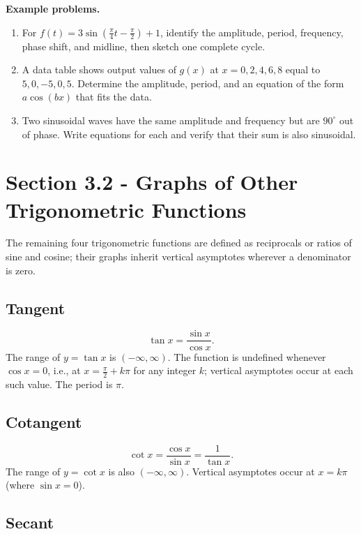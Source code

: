 \textbf{Example problems.}
\begin{enumerate}
    \item For $f(t) = 3\sin\!\left(\frac{\pi}{4}t - \frac{\pi}{2}\right) + 1$, identify the amplitude, period, frequency, phase shift, and midline, then sketch one complete cycle.
    \item A data table shows output values of $g(x)$ at $x = 0, 2, 4, 6, 8$ equal to $5, 0, -5, 0, 5$. Determine the amplitude, period, and an equation of the form $a\cos(bx)$ that fits the data.
    \item Two sinusoidal waves have the same amplitude and frequency but are $90^{\circ}$ out of phase. Write equations for each and verify that their sum is also sinusoidal.
\end{enumerate}

\section{Section 3.2 - Graphs of Other Trigonometric Functions}
\label{sec:sect-07b3}

The remaining four trigonometric functions are defined as reciprocals or
ratios of sine and cosine; their graphs inherit vertical asymptotes wherever
a denominator is zero.

\subsection*{Tangent}

\[
  \tan x = \frac{\sin x}{\cos x}.
\]
The range of $y = \tan x$ is $(-\infty, \infty)$.  The function is undefined
whenever $\cos x = 0$, i.e., at $x = \frac{\pi}{2} + k\pi$ for any integer
$k$; vertical asymptotes occur at each such value.  The period is $\pi$.

\subsection*{Cotangent}

\[
  \cot x = \frac{\cos x}{\sin x} = \frac{1}{\tan x}.
\]
The range of $y = \cot x$ is also $(-\infty, \infty)$.  Vertical asymptotes
occur at $x = k\pi$ (where $\sin x = 0$).

\subsection*{Secant}

